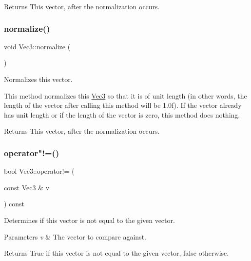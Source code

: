 \begin{DoxyReturn}{Returns}
This vector, after the normalization occurs. 
\end{DoxyReturn}
\mbox{\label{classVec3_a3a6631559d1d36eaf34ca586ce86ede1}} 
\subsubsection{\texorpdfstring{normalize()}{normalize()}\hspace{0.1cm}{\footnotesize\ttfamily [2/2]}}
{\footnotesize\ttfamily void Vec3\+::normalize (\begin{DoxyParamCaption}{ }\end{DoxyParamCaption})}

Normalizes this vector.

This method normalizes this \hyperlink{classVec3}{Vec3} so that it is of unit length (in other words, the length of the vector after calling this method will be 1.\+0f). If the vector already has unit length or if the length of the vector is zero, this method does nothing.

\begin{DoxyReturn}{Returns}
This vector, after the normalization occurs. 
\end{DoxyReturn}
\mbox{\label{classVec3_a4e443bb623f755bdd56aed3b96459871}} 
\subsubsection{\texorpdfstring{operator"!=()}{operator!=()}\hspace{0.1cm}{\footnotesize\ttfamily [1/2]}}
{\footnotesize\ttfamily bool Vec3\+::operator!= (\begin{DoxyParamCaption}\item[{const \hyperlink{classVec3}{Vec3} \&}]{v }\end{DoxyParamCaption}) const\hspace{0.3cm}{\ttfamily [inline]}}

Determines if this vector is not equal to the given vector.


\begin{DoxyParams}{Parameters}
{\em v} & The vector to compare against.\\
\hline
\end{DoxyParams}
\begin{DoxyReturn}{Returns}
True if this vector is not equal to the given vector, false otherwise. 
\end{DoxyReturn}
\mbox{\label{classVec3_a4e443bb623f755bdd56aed3b96459871}} 

